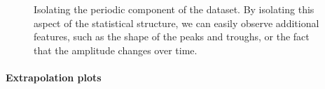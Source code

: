 \documentclass[twoside]{article}
\def\eg{e.g.\ }
\begin{document}
\begin{figure}[ht]
\centering
{}
\caption{Isolating the periodic component of the dataset.  By isolating this aspect of the statistical structure, we can easily observe additional features, such as the shape of the peaks and troughs, or the fact that the amplitude changes over time.}
\label{fig:periodic}
\end{figure}



\paragraph{Extrapolation plots}
\end{document}
